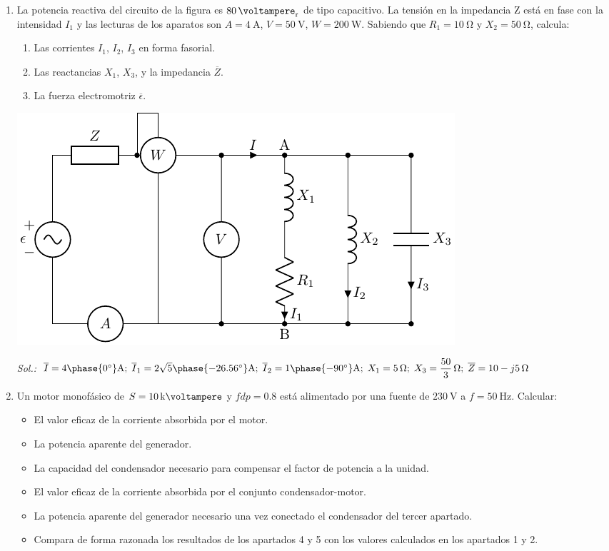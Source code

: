 \begin{enumerate}
\item La potencia reactiva del circuito de la figura es
  $\qty{80}{\voltampere_r}$ de tipo capacitivo. La tensión en la
  impedancia Z está en fase con la intensidad $I_1$ y las lecturas de
  los aparatos son $A = \qty{4}{\ampere}$, $V = \qty{50}{\volt}$,
  $W = \qty{200}{\watt}$. Sabiendo que $R_1 = \qty{10}{\ohm}$ y
  $X_2 = \qty{50}{\ohm}$, calcula:

  \begin{enumerate}
  \item Las corrientes $I_1$, $I_2$, $I_3$ en forma fasorial.
  \item Las reactancias $X_1$, $X_3$, y la impedancia $\overline{Z}$.
  \item La fuerza electromotriz $\overline{\epsilon}$.
  \end{enumerate}
  \begin{center}
    \includegraphics{../figs/BT2_circuitoCapacitivo}
  \end{center}
  \emph{Sol.:\; 
    $\overline{I} =
    4\phase{\ang{0}}\unit{\ampere};\;
    \overline{I}_1 =
    2\sqrt{5}\phase{\ang{-26.56}}\unit{\ampere}
    ;\; \overline{I}_2 =
    1\phase{\ang{-90}}\unit{\ampere} ;\; X_1 =
    \qty{5}{\ohm};\; X_3 =
    \qty[parse-numbers=false]{\dfrac{50}{3}}{\ohm};\; \overline{Z} =
    \qty[parse-numbers=false]{10 - j5}{\ohm}$ }

\item Un motor monofásico de $S = \qty{10}{\kilo\voltampere}$ y $fdp = 0.8$ está
  alimentado por una fuente de $\qty{230}{\volt}$ a $f = \qty{50}{\hertz}$.  Calcular:
  \begin{itemize}
  \item El valor eficaz de la corriente absorbida por el motor.
  \item La potencia aparente del generador.
  \item La capacidad del condensador necesario para compensar el
    factor de potencia a la unidad.
  \item El valor eficaz de la corriente absorbida por el conjunto
    condensador-motor.
  \item La potencia aparente del generador necesario una vez conectado
    el condensador del tercer apartado.
  \item Compara de forma razonada los resultados de los apartados 4 y
    5 con los valores calculados en los apartados 1 y 2.
  \end{itemize}


\end{enumerate}
